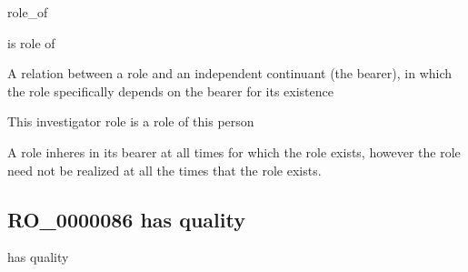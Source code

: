\documentclass[letterpaper,10pt,english]{sphinxmanual}
\begin{document}
\begin{sphinxShadowBox}

\sphinxAtStartPar
role\_of

\sphinxAtStartPar
is role of
\end{sphinxShadowBox}

\begin{sphinxShadowBox}

\sphinxAtStartPar
{\hyperref[\detokenize{doc-RO_0000052::doc}]{}}
\end{sphinxShadowBox}

\begin{sphinxShadowBox}

\sphinxAtStartPar
A relation between a role and an independent continuant (the bearer), in which the role specifically depends on the bearer for its existence
\end{sphinxShadowBox}

\begin{sphinxShadowBox}

\sphinxAtStartPar
This investigator role is a role of this person
\end{sphinxShadowBox}

\begin{sphinxShadowBox}

\sphinxAtStartPar
A role inheres in its bearer at all times for which the role exists, however the role need not be realized at all the times that the role exists.
\end{sphinxShadowBox}

\begin{sphinxShadowBox}

\sphinxAtStartPar
{}
\end{sphinxShadowBox}
\begin{quote}

\ignorespaces \end{quote}


\subsection{RO\_0000086 \sphinxhyphen{} has quality}
\label{\detokenize{doc-RO_0000086:ro-0000086-has-quality}}\label{\detokenize{doc-RO_0000086:index-0}}\label{\detokenize{doc-RO_0000086::doc}}
\begin{sphinxShadowBox}

\sphinxAtStartPar
has quality
\end{sphinxShadowBox}
\end{document}
